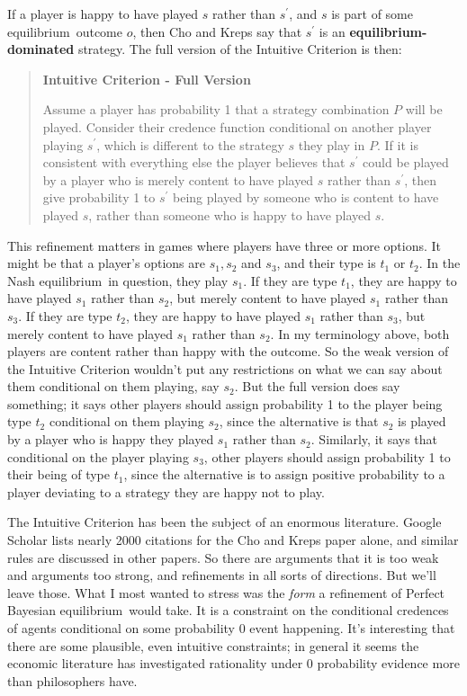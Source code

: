 \documentclass[openany]{book}
\newcommand{\eqm}{equilibrium}
\begin{document}
\noindent If a player is happy to have played $s$ rather than $s^\prime$, and $s$ is part of some \eqm\ outcome $o$, then Cho and Kreps say that $s^\prime$ is an \textbf{equilibrium-dominated} strategy. The full version of the Intuitive Criterion is then:

\begin{quote}
\textbf{Intuitive Criterion - Full Version}

Assume a player has probability 1 that a strategy combination $P$ will be played. Consider their credence function conditional on another player playing $s^\prime$, wh\-ich is different to the strategy $s$ they play in $P$. If it is consistent with everything else the player believes that $s^\prime$ could be played by a player who is merely content to have played $s$ rather than $s^\prime$,  then give probability 1 to $s^\prime$ being played by someone who is content to have played $s$, rather than someone who is happy to have played $s$.
\end{quote}

\noindent This refinement matters in games where players have three or more options. It might be that a player's options are $s_1, s_2$ and  $s_3$, and their type is $t_1$ or $t_2$. In the Nash \eqm\ in question, they play $s_1$. If they are type $t_1$, they are happy to have played $s_1$ rather than $s_2$, but merely content to have played $s_1$ rather than $s_3$. If they are type $t_2$, they are happy to have played $s_1$ rather than $s_3$, but merely content to have played $s_1$ rather than $s_2$. In my terminology above, both players are content rather than happy with the outcome. So the weak version of the Intuitive Criterion wouldn't put any restrictions on what we can say about them conditional on them playing, say $s_2$. But the full version does say something; it says other players should assign probability 1 to the player being type $t_2$ conditional on them playing $s_2$, since the alternative is that $s_2$ is played by a player who is happy they played $s_1$ rather than $s_2$. Similarly, it says that conditional on the player playing $s_3$, other players should assign probability 1 to their being of type $t_1$, since the alternative is to assign positive probability to a player deviating to a strategy they are happy not to play.

The Intuitive Criterion has been the subject of an enormous literature. Goo\-gle Scholar lists nearly 2000 citations for the Cho and Kreps paper alone, and similar rules are discussed in other papers. So there are arguments that it is too weak and arguments too strong, and refinements in all sorts of directions. But we'll leave those. What I most wanted to stress was the \textit{form} a refinement of Perfect Bayesian \eqm\ would take. It is a constraint on the conditional credences of agents conditional on some probability 0 event happening. It's interesting that there are some plausible, even intuitive constraints; in general it seems the economic literature has investigated rationality under 0 probability evidence more than philosophers have.
\end{document}

